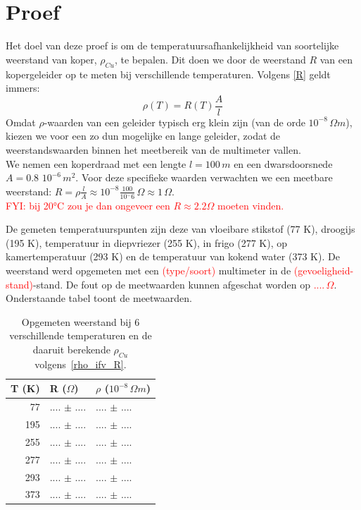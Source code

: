 \documentclass[12pt]{article}
\begin{document}
\section{Proef}

	Het doel van deze proef is om de temperatuursafhankelijkheid van soortelijke weerstand van koper, $ \rho_{Cu}$, te bepalen.
	Dit doen we door de weerstand $R$ van een kopergeleider op te meten bij verschillende temperaturen. 
	Volgens \eqref{R} geldt immers:
		\begin{equation}\label{rho_ifv_R}
			\rho(T) = R(T) \frac{A}{l}
		\end{equation}
	Omdat $\rho$-waarden van een geleider typisch erg klein zijn (van de orde $10^{-8} \,\Omega m$), kiezen we voor een zo dun mogelijke en lange geleider, zodat de weerstandswaarden binnen het meetbereik van de multimeter vallen.
	\\
	We nemen een koperdraad met een lengte $l=100 \, m$ en een  dwarsdoorsnede $A= 0.8 \, \, 10^{-6} \, m^2$.
	Voor deze specifieke waarden verwachten we een meetbare weerstand:
	$ R = \rho \frac{l}{A}  \approx 10^{-8} \frac{100}{10{^-6}} \, \Omega \approx 1 \, \Omega$.  	
	\textcolor{red}{\\ FYI: bij 20°C zou je dan ongeveer een $R \approx 2.2 \Omega$ moeten vinden.}
	
	De gemeten temperatuurspunten zijn deze van vloeibare stikstof (77 K), droogijs (195 K), temperatuur in diepvriezer (255 K), in frigo (277 K), op kamertemperatuur (293 K) en de temperatuur van kokend water (373 K).
	De weerstand werd opgemeten met een \textcolor{red}{(type/soort)} multimeter in de \textcolor{red}{(gevoeligheid-stand)}-stand. De fout op de meetwaarden kunnen afgeschat worden op \textcolor{red}{$.... \, \Omega$}. Onderstaande tabel toont de meetwaarden.
		\begin{table}[h]
		\centering
		\begin{tabular}{r|l|l}
			T (K) & R ($\Omega$) &  $\rho$ ($10^{-8} \, \Omega m$) \\\hline
		  	 77 &  .... $\pm$ .... &  .... $\pm$ .... \\
			195 &  .... $\pm$ .... &  .... $\pm$ .... \\
			255 &  .... $\pm$ .... &  .... $\pm$ .... \\
			277 &  .... $\pm$ .... &  .... $\pm$ .... \\
			293 &  .... $\pm$ .... &  .... $\pm$ .... \\
			373 &  .... $\pm$ .... &  .... $\pm$ ....  
		\end{tabular}
		\caption{\label{tab:data} Opgemeten weerstand bij 6 verschillende temperaturen en de 	daaruit berekende $\rho_{Cu}$ volgens~\eqref{rho_ifv_R}.}
		\end{table}
	
\end{document}
